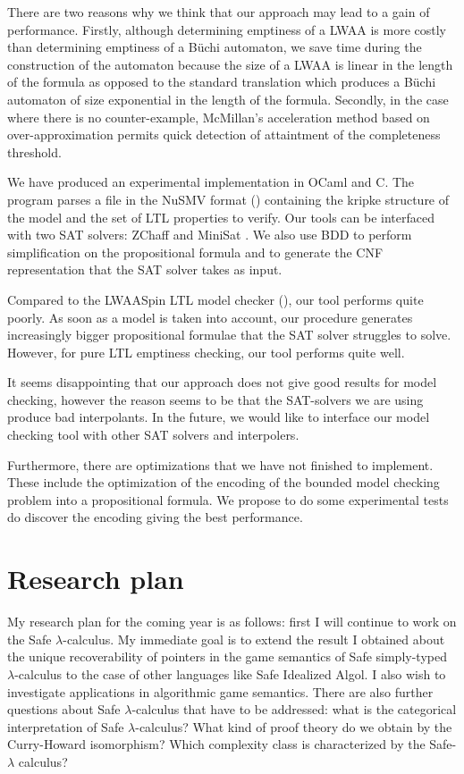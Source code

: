 There are two reasons why we think that our approach may lead to a
gain of performance. Firstly, although determining emptiness of a
LWAA is more costly than determining emptiness of a B\"uchi
automaton, we save time during the construction of the automaton
because the size of a LWAA is linear in the length of the formula as
opposed to the standard translation which produces a B\"uchi
automaton of size exponential in the length of the formula.
Secondly, in the case where there is no counter-example, McMillan's
acceleration method based on over-approximation permits quick
detection of attaintment of the completeness threshold.


We have produced an experimental implementation in OCaml and C. The
program parses a file in the NuSMV format (\cite{CAV02:nusmv})
containing the kripke structure of the model and the set of LTL
properties to verify. Our tools can be interfaced with two SAT
solvers: ZChaff \citep{zChaff} and MiniSat \citep{ES03}. We also use
BDD to perform simplification on the propositional formula and to
generate the CNF representation that the SAT solver takes as input.

Compared to the LWAASpin LTL model checker (\cite{hammer:truly}),
our tool performs quite poorly. As soon as a model is taken into
account, our procedure generates increasingly bigger propositional
formulae that the SAT solver struggles to solve. However, for pure
LTL emptiness checking, our tool performs quite well.

It seems disappointing that our approach does not give good results
for model checking, however the reason seems to be that the
SAT-solvers we are using produce bad interpolants. In the future, we
would like to interface our model checking tool with other SAT
solvers and interpolers.

Furthermore, there are optimizations that we have not finished to
implement. These include the optimization of the encoding of the
bounded model checking problem into a propositional formula. We
propose to do some experimental tests do discover the encoding
giving the best performance.

\chapter{Research plan}

My research plan for the coming year is as follows: first I will
continue to work on the Safe $\lambda$-calculus. My immediate goal
is to extend the result I obtained about the unique recoverability
of pointers in the game semantics of Safe simply-typed
$\lambda$-calculus to the case of other languages like Safe
Idealized Algol. I also wish to investigate applications in
algorithmic game semantics. There are also further questions about
Safe $\lambda$-calculus that have to be addressed: what is the
categorical interpretation of Safe $\lambda$-calculus? What kind of
proof theory do we obtain by the Curry-Howard isomorphism? Which
complexity class is characterized by the Safe-$\lambda$ calculus?


